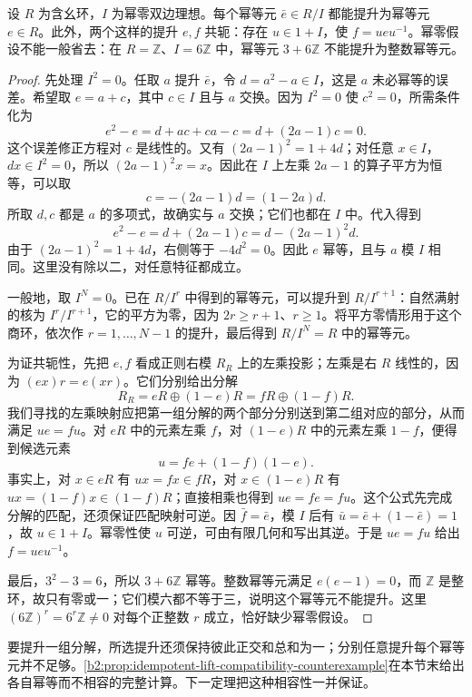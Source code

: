 \begin{theorem}\label{b2:thm:idempotent-lifting}
	设 \(R\) 为含幺环，\(I\) 为幂零双边理想。每个幂等元 \(\bar e\in R/I\) 都能提升为幂等元 \(e\in R\)。此外，两个这样的提升 \(e,f\) 共轭：存在 \(u\in1+I\)，使 \(f=ueu^{-1}\)。幂零假设不能一般省去：在 \(R=\mathbb Z\)、\(I=6\mathbb Z\) 中，幂等元 \(3+6\mathbb Z\) 不能提升为整数幂等元。
\end{theorem}
\begin{proof}
	先处理 \(I^2=0\)。任取 \(a\) 提升 \(\bar e\)，令 \(d=a^2-a\in I\)，这是 \(a\) 未必幂等的误差。希望取 \(e=a+c\)，其中 \(c\in I\) 且与 \(a\) 交换。因为 \(I^2=0\) 使 \(c^2=0\)，所需条件化为
	\[
		e^2-e=d+ac+ca-c=d+(2a-1)c=0.
	\]
	这个误差修正方程对 \(c\) 是线性的。又有 \((2a-1)^2=1+4d\)；对任意 \(x\in I\)，\(dx\in I^2=0\)，所以 \((2a-1)^2x=x\)。因此在 \(I\) 上左乘 \(2a-1\) 的算子平方为恒等，可以取
	\[
		c=-(2a-1)d=(1-2a)d.
	\]
	所取 \(d,c\) 都是 \(a\) 的多项式，故确实与 \(a\) 交换；它们也都在 \(I\) 中。代入得到
	\[
		e^2-e=d+(2a-1)c =d-(2a-1)^2d.
	\]
	由于 \((2a-1)^2=1+4d\)，右侧等于 \(-4d^2=0\)。因此 \(e\) 幂等，且与 \(a\) 模 \(I\) 相同。这里没有除以二，对任意特征都成立。

	一般地，取 \(I^N=0\)。已在 \(R/I^r\) 中得到的幂等元，可以提升到 \(R/I^{r+1}\)：自然满射的核为 \(I^r/I^{r+1}\)，它的平方为零，因为 \(2r\ge r+1\)、\(r\ge1\)。将平方零情形用于这个商环，依次作 \(r=1,\ldots,N-1\) 的提升，最后得到 \(R/I^N=R\) 中的幂等元。

	为证共轭性，先把 \(e,f\) 看成正则右模 \(R_R\) 上的左乘投影；左乘是右 \(R\) 线性的，因为 \((ex)r=e(xr)\)。它们分别给出分解
	\[
		R_R=eR\oplus(1-e)R=fR\oplus(1-f)R.
	\]
	我们寻找的左乘映射应把第一组分解的两个部分分别送到第二组对应的部分，从而满足 \(ue=fu\)。对 \(eR\) 中的元素左乘 \(f\)，对 \((1-e)R\) 中的元素左乘 \(1-f\)，便得到候选元素
	\[
		u=fe+(1-f)(1-e).
	\]
	事实上，对 \(x\in eR\) 有 \(ux=fx\in fR\)，对 \(x\in(1-e)R\) 有 \(ux=(1-f)x\in(1-f)R\)；直接相乘也得到 \(ue=fe=fu\)。这个公式先完成分解的匹配，还须保证匹配映射可逆。因 \(\bar f=\bar e\)，模 \(I\) 后有 \(\bar u=\bar e+(1-\bar e)=1\)，故 \(u\in1+I\)。幂零性使 \(u\) 可逆，可由有限几何和写出其逆。于是 \(ue=fu\) 给出 \(f=ueu^{-1}\)。

	最后，\(3^2-3=6\)，所以 \(3+6\mathbb Z\) 幂等。整数幂等元满足 \(e(e-1)=0\)，而 \(\mathbb Z\) 是整环，故只有零或一；它们模六都不等于三，说明这个幂等元不能提升。这里 \((6\mathbb Z)^r=6^r\mathbb Z\ne0\) 对每个正整数 \(r\) 成立，恰好缺少幂零假设。
\end{proof}

要提升一组分解，所选提升还须保持彼此正交和总和为一；分别任意提升每个幂等元并不足够。\cref{b2:prop:idempotent-lift-compatibility-counterexample}在本节末给出各自幂等而不相容的完整计算。下一定理把这种相容性一并保证。

